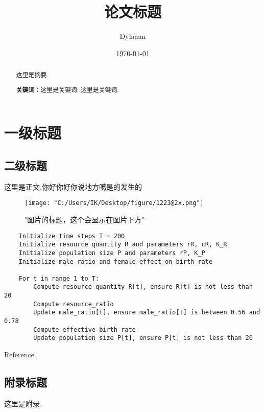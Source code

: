 \documentclass[12pt, a4paper, oneside]{ctexart}
\title{\textbf{论文标题}}
\author{Dylaaan}
\date{\today}
\newcommand{\upcite}[1]{\textsuperscript{\textsuperscript{\cite{#1}}}}
\begin{document}
\maketitle

\setcounter{page}{0}
\maketitle
\thispagestyle{empty}

\begin{abstract}
    这里是摘要.
    \par\textbf{关键词：}这里是关键词; 这里是关键词.
\end{abstract}

\newpage
{}
\setcounter{page}{1}
\tableofcontents
\newpage
\setcounter{page}{1}

\section{一级标题}

\subsection{二级标题}

这里是正文\upcite{wk}.你好你好你说地方噶是的发生的\upcite{Mishra2023}
\begin{figure}[H]
	\texttt{[image: "C:/Users/IK/Desktop/figure/1223@2x.png"]}
	\centering
	\label{"可以和caption保持一致，也可以不写"}
	\caption{"图片的标题，这个会显示在图片下方"}
	\centering
\end{figure}
\begin{verbatim}
    Initialize time steps T = 200
    Initialize resource quantity R and parameters rR, cR, K_R
    Initialize population size P and parameters rP, K_P
    Initialize male_ratio and female_effect_on_birth_rate
    
    For t in range 1 to T:
        Compute resource quantity R[t], ensure R[t] is not less than 20
        Compute resource_ratio
        Update male_ratio[t], ensure male_ratio[t] is between 0.56 and 0.78
        Compute effective_birth_rate
        Update population size P[t], ensure P[t] is not less than 20
    \end{verbatim}
\newpage
Reference


\begin{appendices}
    \renewcommand{\thesection}{\Alph{section}}
    \section{附录标题}
    这里是附录.
\end{appendices}
\end{document}
